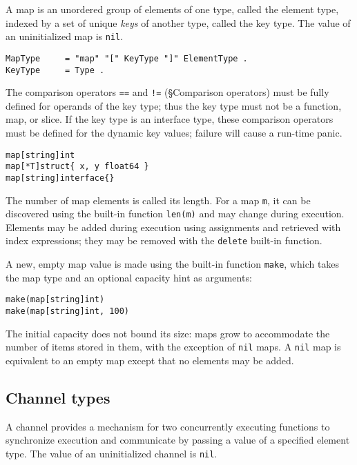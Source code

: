 {A map is an unordered group of elements of one type, called the element
type, indexed by a set of unique \emph{keys} of another type, called the
key type. The value of an uninitialized map is \texttt{nil}.

\begin{Verbatim}[frame=single]
MapType     = "map" "[" KeyType "]" ElementType .
KeyType     = Type .
\end{Verbatim}

The comparison operators \texttt{==} and \texttt{!=}
(§Comparison operators) must be fully
defined for operands of the key type; thus the key type must not be a
function, map, or slice. If the key type is an interface type, these
comparison operators must be defined for the dynamic key values; failure
will cause a run-time panic.

\begin{Verbatim}[frame=single]
map[string]int
map[*T]struct{ x, y float64 }
map[string]interface{}
\end{Verbatim}

The number of map elements is called its length. For a map \texttt{m},
it can be discovered using the built-in function
\texttt{len(m)} and may change during
execution. Elements may be added during execution using
assignments and retrieved with
index expressions; they may be removed with the
\texttt{delete} built-in
function.

A new, empty map value is made using the built-in function
\texttt{make}, which
takes the map type and an optional capacity hint as arguments:

\begin{Verbatim}[frame=single]
make(map[string]int)
make(map[string]int, 100)
\end{Verbatim}

The initial capacity does not bound its size: maps grow to accommodate
the number of items stored in them, with the exception of \texttt{nil}
maps. A \texttt{nil} map is equivalent to an empty map except that no
elements may be added.

\subsection*{Channel types}

A channel provides a mechanism for two concurrently executing functions
to synchronize execution and communicate by passing a value of a
specified element type. The value of an uninitialized channel is
\texttt{nil}.

}
